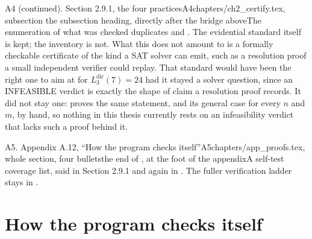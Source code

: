 \begin{offcutrewrite}{A4 (continued). Section 2.9.1, the four practices}{A4}{chapters/ch2\_certify.tex, subsection }{the subsection heading, directly after the bridge above}{The enumeration of what was checked duplicates  and . The evidential standard itself is kept; the inventory is not.}
What this does not amount to is a formally checkable certificate of the kind a SAT solver can emit, such as a resolution proof a small independent verifier could replay. That standard would have been the right one to aim at for $L_3^{\mathrm{dir}}(7) = 24$ had it stayed a solver question, since an INFEASIBLE verdict is exactly the shape of claim a resolution proof records. It did not stay one:  proves the same statement, and its general case for every $n$ and $m$, by hand, so nothing in this thesis currently rests on an infeasibility verdict that lacks such a proof behind it.
\end{offcutrewrite}

\begin{offcut}{A5. Appendix A.12, ``How the program checks itself''}{A5}{chapters/app\_proofs.tex, whole section, four bullets}{the end of , at the foot of the appendix}{A self-test coverage list, said in Section 2.9.1 and again in . The fuller verification ladder stays in .}
\section{How the program checks itself}


\end{offcut}
